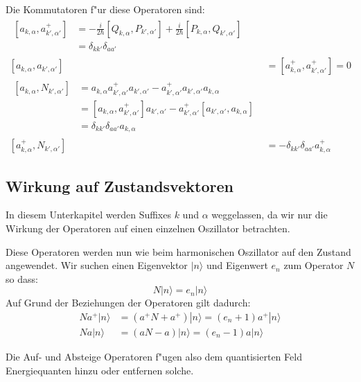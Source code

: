 Die Kommutatoren f"ur diese Operatoren sind:
\begin{align*}
\begin{split}
[a_{k,\alpha} , a^+_{k',\alpha'}] &= - \frac{i}{2 \hbar} [Q_{k,\alpha}, P_{k',\alpha'}] + \frac{i}{2 \hbar} [P_{k,\alpha}, Q_{k',\alpha'}] \\
	 &= \delta_{kk'}\delta_{aa'}
\end{split}\\
[a_{k,\alpha} , a_{k',\alpha'}] &= [a^+_{k,\alpha} , a^+_{k',\alpha'}] = 0 \\
\begin{split}
[a_{k,\alpha} , N_{k',\alpha'}] &= a_{k,\alpha} a^+_{k',\alpha'} a_{k',\alpha'} - a^+_{k',\alpha'} a_{k',\alpha'} a_{k,\alpha} \\
	&= [a_{k,\alpha} , a^+_{k',\alpha'}]a_{k',\alpha'} - a^+_{k',\alpha'}[a_{k',\alpha'} , a_{k,\alpha}]\\
	&= \delta_{kk'}\delta_{aa'} a_{k,\alpha}
\end{split} \\
[a^+_{k,\alpha} , N_{k',\alpha'}] &= -\delta_{kk'}\delta_{aa'} a^+_{k,\alpha}
\end{align*}

\subsection{Wirkung auf Zustandsvektoren}

In diesem Unterkapitel werden Suffixes $k$ und $\alpha$ weggelassen, da wir nur die Wirkung der Operatoren auf einen einzelnen Oszillator betrachten. 

Diese Operatoren werden nun wie beim harmonischen Oszillator auf den Zustand angewendet. Wir suchen einen Eigenvektor $|n\rangle$ und Eigenwert $e_n$ zum Operator $N$ so dass:
\begin{equation*}
N|n\rangle = e_n|n\rangle
\end{equation*}
Auf Grund der Beziehungen der Operatoren gilt dadurch:
\begin{align*}
Na^+|n\rangle &= (a^+N + a^+)|n\rangle = (e_n + 1)a^+|n\rangle \\
Na|n\rangle &= (aN - a)|n\rangle = (e_n - 1)a|n\rangle
\end{align*}

Die Auf- und Absteige Operatoren f"ugen also dem quantisierten Feld Energiequanten hinzu oder entfernen solche.

